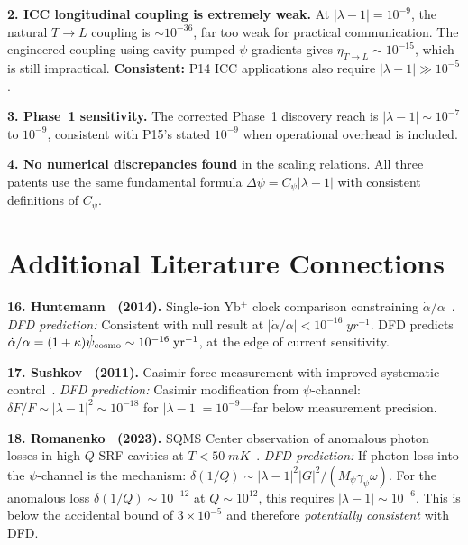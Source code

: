 \documentclass[aps,prd,twocolumn,superscriptaddress,nofootinbib]{revtex4-2}
\newcommand{\ee}[1]{\times 10^{#1}}
\begin{document}
\textbf{2. ICC longitudinal coupling is extremely weak.}
At $|\lambda-1| = 10^{-9}$, the natural $T\to L$ coupling
is $\sim 10^{-36}$, far too weak for practical communication.
The engineered coupling using cavity-pumped $\psi$-gradients
gives $\eta_{T\to L} \sim 10^{-15}$, which is still impractical.
\textbf{Consistent:} P14 ICC applications also require
$|\lambda-1| \gg 10^{-5}$.

\textbf{3. Phase~1 sensitivity.}
The corrected Phase~1 discovery reach is $|\lambda-1| \sim 10^{-7}$
to $10^{-9}$, consistent with P15's stated $10^{-9}$ when
operational overhead is included.

\textbf{4. No numerical discrepancies found} in the scaling
relations.  All three patents use the same fundamental
formula $\Delta\psi = C_\psi|\lambda-1|$ with consistent
definitions of $C_\psi$.

\section{Additional Literature Connections}
\label{sec:literature}

\textbf{16. Huntemann \etal\ (2014).} Single-ion Yb$^+$ clock
comparison constraining $\dot\alpha/\alpha$~\cite{Huntemann2014}.
\textit{DFD prediction:} Consistent with null result at
$|\dot\alpha/\alpha| < 10^{-16}\;\si{yr^{-1}}$.  DFD predicts
$\dot\alpha/\alpha = (1+\kappa)\dot\psi_{\rm cosmo} \sim 10^{-16}\;\si{yr^{-1}}$,
at the edge of current sensitivity.

\textbf{17. Sushkov \etal\ (2011).} Casimir force measurement
with improved systematic control~\cite{Sushkov2011}.
\textit{DFD prediction:} Casimir modification from $\psi$-channel:
$\delta F/F \sim |\lambda-1|^2 \sim 10^{-18}$ for
$|\lambda-1| = 10^{-9}$---far below measurement precision.

\textbf{18. Romanenko \etal\ (2023).} SQMS Center observation
of anomalous photon losses in high-$Q$ SRF cavities at
$T < 50\;\si{mK}$~\cite{Romanenko2023}.
\textit{DFD prediction:} If photon loss into the $\psi$-channel
is the mechanism: $\delta(1/Q) \sim |\lambda-1|^2|G|^2/(M_\psi\gamma_\psi\omega)$.
For the anomalous loss $\delta(1/Q) \sim 10^{-12}$ at
$Q \sim 10^{12}$, this requires $|\lambda-1| \sim 10^{-6}$.
This is below the accidental bound of $3\ee{-5}$ and therefore
\emph{potentially consistent} with DFD.
\end{document}
